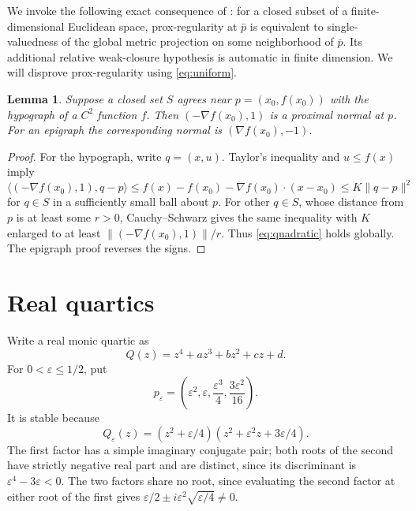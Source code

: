 \documentclass[11pt]{article}
\newtheorem{lemma}{Lemma}
\newcommand{\ip}[2]{\langle #1,#2\rangle}
\newcommand{\norm}[1]{\lVert #1\rVert}
\begin{document}
We invoke the following exact consequence of
\cite[Theorem~1.3(a),(k)]{prt}: for a closed subset of a finite-dimensional Euclidean space, prox-regularity at \(\bar p\) is equivalent to single-valuedness of the global metric projection on some neighborhood of \(\bar p\). Its additional relative weak-closure hypothesis is automatic in finite dimension. We will disprove prox-regularity using \eqref{eq:uniform}.

\begin{lemma}\label{lem:smooth}
Suppose a closed set \(S\) agrees near \(p=(x_0,f(x_0))\) with the hypograph of a \(C^2\) function \(f\). Then \((-\nabla f(x_0),1)\) is a proximal normal at \(p\). For an epigraph the corresponding normal is \((\nabla f(x_0),-1)\).
\end{lemma}
\begin{proof}
For the hypograph, write \(q=(x,u)\). Taylor's inequality and \(u\leq f(x)\) imply
\[
 \ip{(-\nabla f(x_0),1)}{q-p}
 \leq f(x)-f(x_0)-\nabla f(x_0)\cdot(x-x_0)
 \leq K\norm{q-p}^2
\]
for \(q\in S\) in a sufficiently small ball about \(p\).
For other \(q\in S\), whose distance from \(p\) is at least some \(r>0\), Cauchy--Schwarz gives the same inequality with
\(K\) enlarged to at least
\(\norm{(-\nabla f(x_0),1)}/r\).
Thus \eqref{eq:quadratic} holds globally. The epigraph proof reverses the signs.
\end{proof}

\section{Real quartics}

Write a real monic quartic as
\[
 Q(z)=z^4+az^3+bz^2+cz+d.
\]
For \(0<\varepsilon\leq1/2\), put
\[
 p_\varepsilon=
 \left(\varepsilon^2,\varepsilon,
       \frac{\varepsilon^3}{4},\frac{3\varepsilon^2}{16}\right).
\]
It is stable because
\begin{equation}\label{eq:factor}
 Q_\varepsilon(z)=
 (z^2+\varepsilon/4)
 (z^2+\varepsilon^2z+3\varepsilon/4).
\end{equation}
The first factor has a simple imaginary conjugate pair; both roots of the second have strictly negative real part and are distinct, since its discriminant is \(\varepsilon^4-3\varepsilon<0\). The two factors share no root, since evaluating the second factor at either root of the first gives
\(\varepsilon/2\mathbin{\pm}i\varepsilon^2\sqrt{\varepsilon/4}\ne0\).
\end{document}
